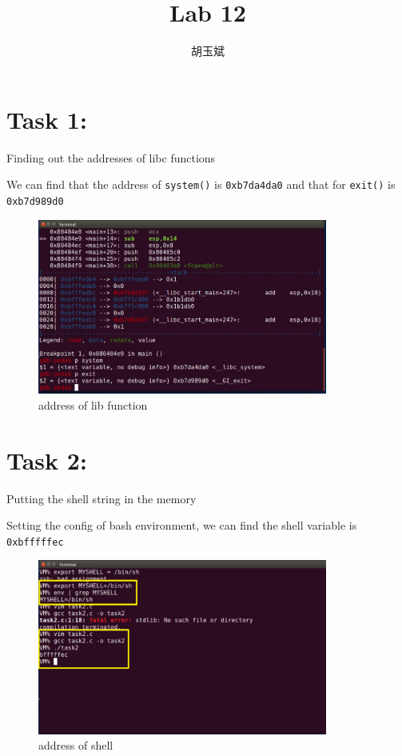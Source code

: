 \documentclass[onecolumn,oneside]{SUSTechHomework}
\author{胡玉斌}
\title{Lab 12}
\begin{document}
  \maketitle

  \section*{Task 1:}
  Finding out the addresses of libc functions

  We can find that the address of \verb|system()| is \verb|0xb7da4da0| and that for \verb|exit()| is \verb|0xb7d989d0| 

  \begin{figure}[H]
    \centering
    \includegraphics[width=0.85\textwidth]{img/task1_1.png}
    \caption{address of lib function}
  \end{figure}

  \section*{Task 2:}
  Putting the shell string in the memory

  Setting the config of bash environment, we can find the shell variable is \verb|0xbfffffec|

  \begin{figure}[H]
    \centering
    \includegraphics[width=0.85\textwidth]{img/task2_1.png}
    \caption{address of shell}
  \end{figure}
\end{document}
